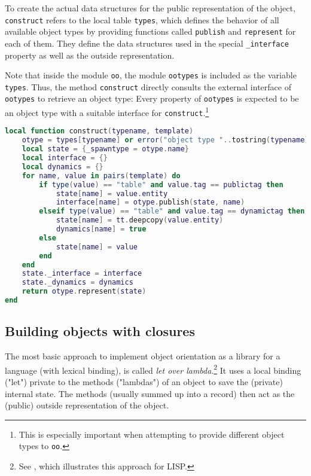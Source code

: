 To create the actual data structures for the public representation of the object, \texttt{construct} refers to the local table \texttt{types}, which defines the behavior of all available object types by providing functions called \texttt{publish} and \texttt{represent} for each of them. They define the data structures used in the special \texttt{\_interface} property as well as the outside representation.

Note that inside the module \texttt{oo}, the module \texttt{ootypes} is included as the variable \texttt{types}. Thus, the method \texttt{construct} directly consults the external interface of \texttt{ootypes} to retrieve an object type: Every property of \texttt{ootypes} is expected to be an object type with a suitable interface for \texttt{construct}.\footnote{This is especially important when attempting to provide different object types to \texttt{oo}.}

\begin{lstlisting}[language=lua, caption={The definition of \texttt{construct} from \texttt{"oo.lua"}}, label=lst:construct, name=lst:construct]
local function construct(typename, template)
    otype = types[typename] or error("object type "..tostring(typename).." doesn't exist")
    local state = {_spawntype = otype.name}
    local interface = {}
    local dynamics = {}
    for name, value in pairs(template) do
        if type(value) == "table" and value.tag == publictag then
            state[name] = value.entity
            interface[name] = otype.publish(state, name)
        elseif type(value) == "table" and value.tag == dynamictag then 
            state[name] = tt.deepcopy(value.entity)
            dynamics[name] = true
        else
            state[name] = value
        end
    end
    state._interface = interface
    state._dynamics = dynamics
    return otype.represent(state)
end
\end{lstlisting}


\subsection{Building objects with closures}

The most basic approach to implement object orientation as a library for a language (with lexical binding), is called \emph{let over lambda}.\footnote{See \cite{Hoyte2008}, which illustrates this approach for LISP.} It uses a local binding ("let") private to the methods ("lambdas") of an object to save the (private) internal state. The methods (usually summed up into a record) then act as the (public) outside representation of the object.


